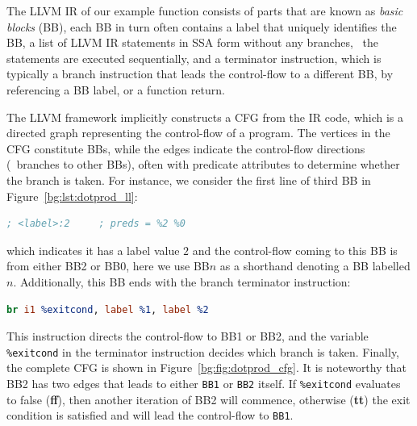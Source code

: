 The LLVM IR of our example function consists of parts that are known as
\emph{basic blocks} (BB), each BB in turn often contains a label that
uniquely identifies the BB, a list of LLVM IR statements in SSA form
without any branches, \ie~the statements are executed sequentially, and a
terminator instruction, which is typically a branch instruction that leads
the control-flow to a different BB, by referencing a BB label, or a function
return.

The LLVM framework implicitly constructs a CFG from the IR code, which is a
directed graph representing the control-flow of a program.  The vertices in
the CFG constitute BBs, while the edges indicate the control-flow directions
(\ie~branches to other BBs), often with predicate attributes to determine
whether the branch is taken.  For instance, we consider the first line of third
BB in Figure~\ref{bg:lst:dotprod_ll}:
\begin{lstlisting}[language=LLVM, basicstyle=\tt]
    ; <label>:2     ; preds = %2 %0
\end{lstlisting}\vspace{-16.5pt}
which indicates it has a label value $2$ and the control-flow coming to this
BB is from either BB2 or BB0, here we use BB$n$ as a shorthand denoting a
BB labelled $n$.  Additionally, this BB ends with the branch terminator
instruction:
\begin{lstlisting}[language=LLVM, basicstyle=\tt]
    br i1 %exitcond, label %1, label %2
\end{lstlisting}\vspace{-16.5pt}
This instruction directs the control-flow to BB1 or BB2, and the variable
\verb|%exitcond| in the terminator instruction decides which branch is taken.
Finally, the complete CFG is shown in Figure~\ref{bg:fig:dotprod_cfg}.  It is
noteworthy that BB2 has two edges that leads to either \verb|BB1| or \verb|BB2|
itself.  If \verb|%exitcond| evaluates to false (\textbf{ff}), then another
iteration of BB2 will commence, otherwise (\textbf{tt}) the exit condition is
satisfied and will lead the control-flow to \verb|BB1|.
